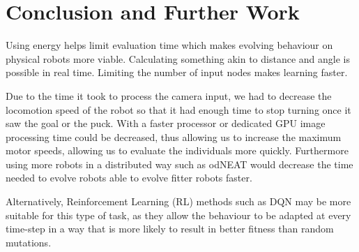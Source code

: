 \documentclass{article}
\begin{document}

	\section{Conclusion and Further Work} %
	\label{sec:conclusion}
	Using energy helps limit evaluation time which makes evolving behaviour on
	physical robots more viable.
	Calculating something akin to distance and angle is possible in real time.
	Limiting the number of input nodes makes learning faster. %

	Due to the time it took to process the camera input, we had to decrease the
	locomotion speed of the robot so that it had enough time to stop turning
	once it saw the goal or the puck. With a faster processor or dedicated GPU
	image processing time could be decreased, thus allowing us to increase the
	maximum motor speeds, allowing us to evaluate the individuals more quickly.
	Furthermore using more robots in a distributed way such as odNEAT
	\cite{silva2012odneat} would decrease the time needed to evolve robots able
	to evolve fitter robots faster.

	Alternatively, Reinforcement Learning (RL) methods such as DQN
	\cite{mnih2013playing} may be more suitable for this type of task, as they
	allow the behaviour to be adapted at every time-step in a way that is more
	likely to result in better fitness than random mutations.



\end{document}
